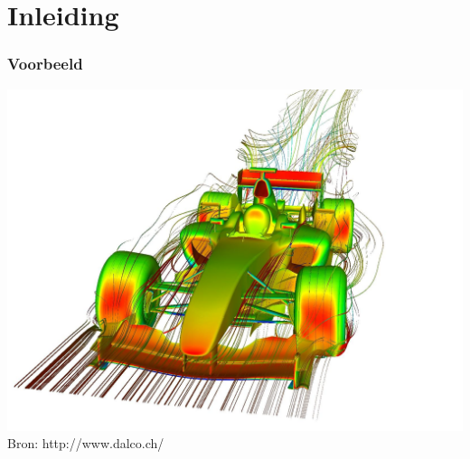 \documentclass[t]{beamer}
\subtitle{Behoudsvergelijkingen langs stroomlijnen}
\begin{document}
	\frame{\titlepage}
	\section{Inleiding}
	\begin{frame}
		\frametitle{Voorbeeld}
		\center
    	\includegraphics[height=0.8\textheight]{fig/deeltjesvergelijkingen/Dalco_Supercomputer_CFD_BMW_F1_PressurePath.jpg}\\
		\footnotesize{Bron: http://www.dalco.ch/}
  	\end{frame}
\end{document}
